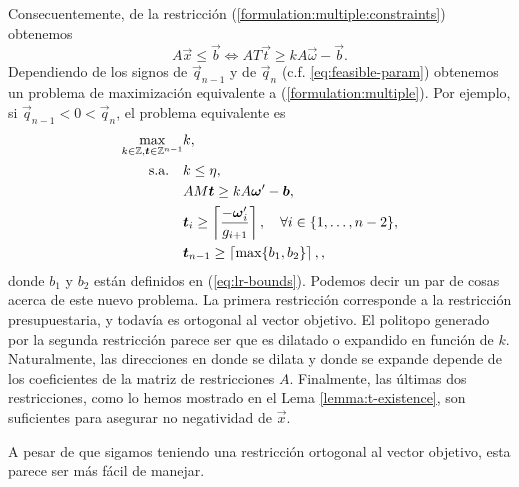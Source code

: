 Consecuentemente, de la restricción (\ref{formulation:multiple:constraints}) obtenemos
\begin{equation}
	A\vec{x} \leq \vec{b} \iff AT\vec{t} \geq kA\vec{\omega} - \vec{b}.
\end{equation}
Dependiendo de los signos de $\vec{q}_{n-1}$ y de $\vec{q}_n$ (c.f. \ref{eq:feasible-param})
obtenemos un problema de maximización equivalente a (\ref{formulation:multiple}). Por ejemplo, si
$\vec{q}_{n-1} < 0 < \vec{q}_n$, el problema equivalente es
\begin{subequations}
	\label{formulation:lattice}
	\begin{align}
		\max_{k \in \mathbb{Z}, \boldsymbol{t} \in \mathbb{Z}^{n-1}}
			& k, \\
		\text{s.a.} \quad
			& k \leq \eta, \label{lattice:c-layer} \\
			& AM\boldsymbol{t} \geq kA\boldsymbol{\omega}' - \boldsymbol{b}, \label{lattice:constraints} \\
			& \boldsymbol{t}_i \geq \left\lceil \frac{-\boldsymbol{\omega}_i'}{g_{i + 1}} \right\rceil, \quad
			\forall i \in \lbrace 1, \ldots, n - 2 \rbrace, \label{lattice:pos-1} \\
			& \boldsymbol{t}_{n - 1} \geq \left\lceil \max\lbrace b_1, b_2 \rbrace \right\rceil,
			\label{lattice:pos-2},
	\end{align}
\end{subequations}
donde $b_1$ y $b_2$ están definidos en (\ref{eq:lr-bounds}). Podemos decir un par de cosas acerca de
este nuevo problema. La primera restricción corresponde a la restricción presupuestaria, y todavía es
ortogonal al vector objetivo. El politopo generado por la segunda restricción parece ser que es
dilatado o expandido en función de $k$. Naturalmente, las direcciones en donde se dilata y donde se
expande depende de los coeficientes de la matriz de restricciones $A$. Finalmente, las últimas dos
restricciones, como lo hemos mostrado en el Lema \ref{lemma:t-existence}, son suficientes para
asegurar no negatividad de $\vec{x}$.

A pesar de que sigamos teniendo una restricción ortogonal al vector objetivo, esta parece ser más
fácil de manejar.

